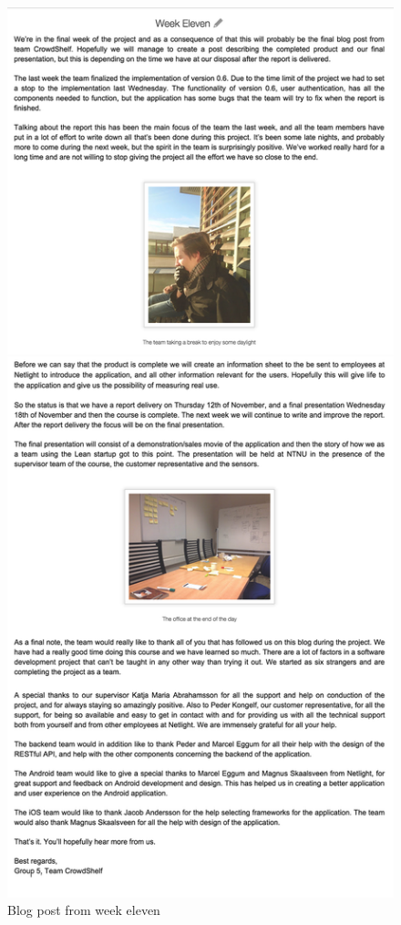 \begin{figure}
\centering
\includegraphics[height=\textheight]{figs/v06/week-11.png}
\caption{Blog post from week eleven}
\label{fig:blog-week-11}
\end{figure}

